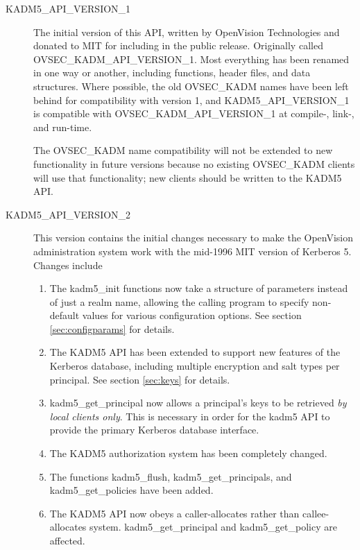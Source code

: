 \begin{description}
\item[KADM5_API_VERSION_1] The initial version of this API, written by
OpenVision Technologies and donated to MIT for including in the public
release.  Originally called OVSEC_KADM_API_VERSION_1.  Most everything
has been renamed in one way or another, including functions, header
files, and data structures.  Where possible, the old OVSEC_KADM names
have been left behind for compatibility with version 1, and
KADM5_API_VERSION_1 is compatible with OVSEC_KADM_API_VERSION_1 at
compile-, link-, and run-time.

The OVSEC_KADM name compatibility will not be extended to new
functionality in future versions because no existing OVSEC_KADM
clients will use that functionality; new clients should be written to
the KADM5 API.

\item[KADM5_API_VERSION_2] This version contains the initial changes
necessary to make the OpenVision administration system work with the
mid-1996 MIT version of Kerberos 5.  Changes include
\begin{enumerate}
\item The kadm5_init functions now take a structure of parameters
instead of just a realm name, allowing the calling program to specify
non-default values for various configuration options.  See section
\ref{sec:configparams} for details.

\item The KADM5 API has been extended to support new features of the
Kerberos database, including multiple encryption and salt types per
principal.  See section \ref{sec:keys} for details.

\item kadm5_get_principal now allows a principal's keys to be
retrieved {\it by local clients only}.  This is necessary in order for
the kadm5 API to provide the primary Kerberos database interface.

\item The KADM5 authorization system has been completely changed.

\item The functions kadm5_flush, kadm5_get_principals, and
kadm5_get_policies have been added.

\item The KADM5 API now obeys a caller-allocates rather than
callee-allocates system.  kadm5_get_principal and kadm5_get_policy are
affected.
\end{enumerate}
\end{description}

